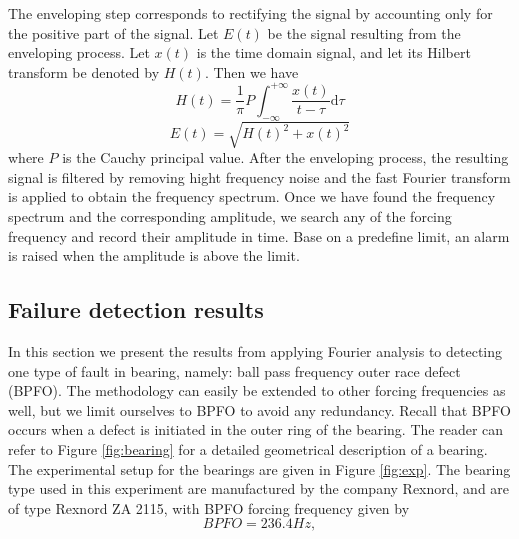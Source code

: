 \documentclass[../Main/thesis.tex]{subfiles}
\begin{document}
\justify
The enveloping step corresponds to rectifying the signal by accounting only for the positive part of the signal. Let $E(t)$ be the signal resulting from the enveloping process. Let $x(t)$ is the time domain signal, and let its Hilbert transform be denoted by $H(t)$. Then we have
\begin{equation}
H(t) = \frac{1}{\pi}P\int_{-\infty}^{+\infty}\frac{x(t)}{t-\tau}\mathrm{d}\tau
\end{equation}
\begin{equation}
E(t) = \sqrt{H(t)^{2}+ x(t)^{2}}
\end{equation}
where $P$ is the Cauchy principal value. After the enveloping process, the resulting signal is filtered by removing hight frequency noise and the fast Fourier transform is applied to obtain the frequency spectrum.
\justify
Once we have found the frequency spectrum and the corresponding amplitude, we search any of the forcing frequency and record their amplitude in time. Base on a predefine limit, an alarm is raised when the amplitude is above the limit.



\clearpage
\subsection{Failure detection results}
In this section we present the results from applying Fourier analysis to detecting one type of fault in bearing, namely: ball pass frequency outer race defect (BPFO). The methodology can easily be extended to other forcing frequencies as well, but we limit ourselves to BPFO to avoid any redundancy. Recall that BPFO occurs when a defect is initiated in the outer ring of the bearing. The reader can refer to Figure \ref{fig:bearing} for a detailed geometrical description of a bearing. The experimental setup for the bearings are given in Figure \ref{fig:exp}. The bearing type used in this experiment are manufactured by the company Rexnord, and are of type Rexnord ZA 2115, with BPFO forcing frequency  given by 
\begin{equation}
BPFO = 236.4 Hz, %
\end{equation}

\end{document}
